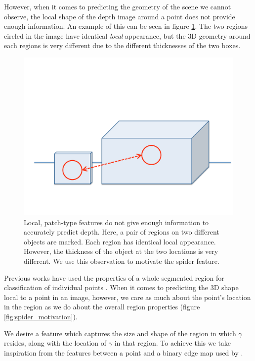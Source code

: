 \documentclass[10pt,twocolumn,letterpaper]{article}
\newcommand{\pixelidx}{\gamma}
\newcommand{\todo}[1]{\textcolor{red}{TODO: #1}}
\begin{document}
However, when it comes to predicting the geometry of the scene we cannot observe, the local shape of the depth image around a point does not provide enough information. 
An example of this can be seen in figure \ref{fig:patch_problems}.
The two regions circled in the image have identical \emph{local} appearance, but the 3D geometry around each regions is very different due to the different thicknesses of the two boxes.


\begin{figure}[bt]
  \centering 
  \includegraphics[width=0.9\columnwidth]{features_1}
  \caption{Local, patch-type features do not give enough information to accurately predict depth. Here, a pair of regions on two different objects are marked. Each region has identical local appearance. However, the thickness of the object at the two locations is very different. 
  We use this observation to motivate the spider feature.}
  \label{fig:patch_problems}
\end{figure}


Previous works have used the properties of a whole segmented region for classification of individual points \cite{golovinskiy-iccv-2009}.
When it comes to predicting the 3D shape local to a point in an image, however, we care as much about the point's location in the region as we do about the overall region properties (figure \ref{fig:spider_motivation}).

We desire a feature which captures the size and shape of the region in which $\pixelidx$ resides, along with the location of $\pixelidx$ in that region.
To achieve this we take inspiration from the features between a point and a binary edge map used by \cite{drost-3dimpvt-2012}.
\end{document}
